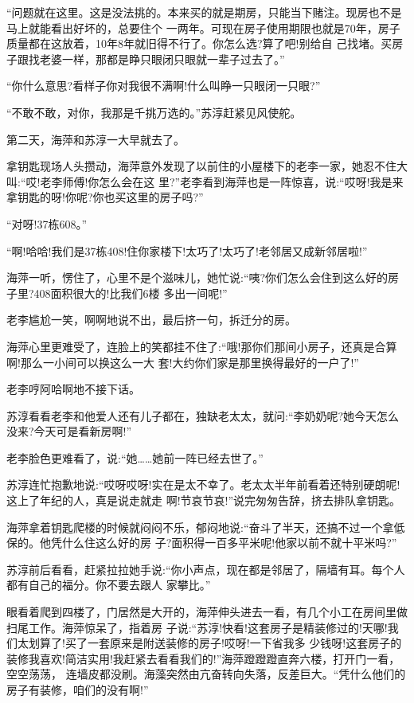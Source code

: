 \documentclass[11pt,a4paper,onecolumn]{article}
\begin{document}
``问题就在这里。这是没法挑的。本来买的就是期房，只能当下赌注。现房也不是马上就能看出好坏的，总要住个
一两年。可现在房子使用期限也就是70年，房子质量都在这放着，10年8年就旧得不行了。你怎么选?算了吧!别给自
己找堵。买房子跟找老婆一样，那都是睁只眼闭只眼就一辈子过去了。''

``你什么意思?看样子你对我很不满啊!什么叫睁一只眼闭一只眼?''

``不敢不敢，对你，我那是千挑万选的。''苏淳赶紧见风使舵。

第二天，海萍和苏淳一大早就去了。

拿钥匙现场人头攒动，海萍意外发现了以前住的小屋楼下的老李一家，她忍不住大叫:``哎!老李师傅!你怎么会在这
里?''老李看到海萍也是一阵惊喜，说:``哎呀!我是来拿钥匙的呀!你呢?你也买这里的房子吗?''

``对呀!37栋608。''

``啊!哈哈!我们是37栋408!住你家楼下!太巧了!太巧了!老邻居又成新邻居啦!''

海萍一听，愣住了，心里不是个滋味儿，她忙说:``咦?你们怎么会住到这么好的房子里?408面积很大的!比我们6楼
多出一间呢!''

老李尴尬一笑，啊啊地说不出，最后挤一句，拆迁分的房。

海萍心里更难受了，连脸上的笑都挂不住了:``哦!那你们那间小房子，还真是合算啊!那么一小间可以换这么一大
套!大约你们家是那里换得最好的一户了!''

老李哼阿哈啊地不接下话。

苏淳看看老李和他爱人还有儿子都在，独缺老太太，就问:``李奶奶呢?她今天怎么没来?今天可是看新房啊!''

老李脸色更难看了，说:``她……她前一阵已经去世了。''

苏淳连忙抱歉地说:``哎呀哎呀!实在是太不幸了。老太太半年前看着还特别硬朗呢!这上了年纪的人，真是说走就走
啊!节哀节哀!''说完匆匆告辞，挤去排队拿钥匙。

海萍拿着钥匙爬楼的时候就闷闷不乐，郁闷地说:``奋斗了半天，还搞不过一个拿低保的。他凭什么住这么好的房
子?面积得一百多平米呢!他家以前不就十平米吗?''

苏淳前后看看，赶紧拉拉她手说:``你小声点，现在都是邻居了，隔墙有耳。每个人都有自己的福分。你不要去跟人
家攀比。''

眼看着爬到四楼了，门居然是大开的，海萍伸头进去一看，有几个小工在房间里做扫尾工作。海萍惊呆了，指着房
子说:``苏淳!快看!这套房子是精装修过的!天哪!我们太划算了!买了一套原来是附送装修的房子!哎呀!一下省我多
少钱呀!这套房子的装修我喜欢!简洁实用!我赶紧去看看我们的!''海萍蹬蹬蹬直奔六楼，打开门一看，空空荡荡，
连墙皮都没刷。海藻突然由亢奋转向失落，反差巨大。``凭什么他们的房子有装修，咱们的没有啊!''
\end{document}
